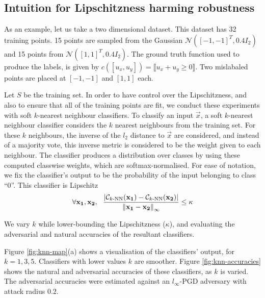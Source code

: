 \documentclass{ociamthesis}
\begin{document}
\subsection*{Intuition for Lipschitzness harming robustness}
As an example, let us take a two dimensional dataset. This dataset has 32
training points. 15 points are sampled from the Gaussian $\mathcal{N}([-1,
-1]^T, 0.4I_2)$ and 15 points from $\mathcal{N}([1, 1]^T, 0.4I_2)$. The ground
truth function used to produce the labels, is given by $c([u_x, u_y]) =
\llbracket u_x+u_y \geq 0 \rrbracket$. Two mislabaled points are placed at $[-1,
-1]$ and $[1, 1]$ each.

Let $S$ be the training set. In order to have control over the Lipschitzness,
and also to ensure that all of the training points are fit, we conduct these
experiments with soft $k$-nearest neighbour classifiers. To classify an input
$\vec{x}$, a soft $k$-nearest neighbour classifier considers the $k$ nearest
neighbours from the training set. For these $k$ neighbours, the inverse of the
$l_2$ distance to $\vec{x}$ are considered, and instead of a majority vote, this
inverse metric is considered to be the weight given to each neighbour. The
classifier produces a distribution over classes by using these computed
classwise weights, which are softmax-normalised. For ease of notation, we fix
the classifier's output to be the probability of the input belonging to class
``0''. This classifier is Lipschitz
\begin{equation*}
    \forall {\mathbf{x_1}}, {\mathbf{x_2}},~~
    \frac{|
        \mathcal{C}_{k\text{-NN}}({\mathbf{x_1}}) - \mathcal{C}_{k\text{-NN}}({\mathbf{x_2}})
    |}{\mathrm{\left\lVert{\mathbf{x_1}} - {\mathbf{x_2}}\right\rVert}_\infty}
    \leq \kappa
\end{equation*}

We vary $k$ while lower-bounding the Lipschitzness ($\kappa$), and evaluating
the adversarial and natural accuracies of the resultant classifiers.

Figure \ref{fig:knn-map}(a) shows a visualisation of the classifiers' output,
for $k=1,3,5$. Classifiers with lower values $k$ are smoother. Figure
\ref{fig:knn-accuracies} shows the natural and adversarial accuracies of these
classifiers, as $k$ is varied. The adversarial accuracies were estimated against
an $l_\infty$-PGD adversary with attack radius $0.2$.
\end{document}
